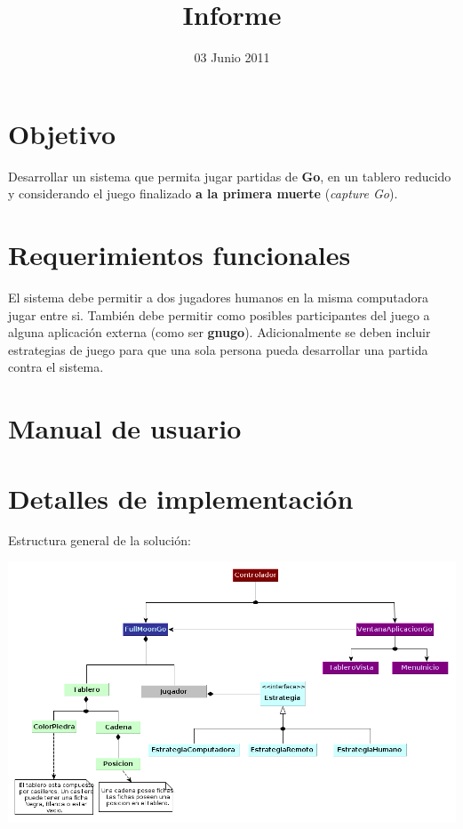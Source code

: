 \documentclass[11pt]{article}
\title{Informe}
\author{}
\date{03 Junio 2011}
\begin{document}
\thispagestyle{empty}
  

\setcounter{tocdepth}{3}
\tableofcontents
\vspace*{1cm}
\section{Objetivo}
\label{sec-1}

  Desarrollar un sistema que permita jugar partidas de \textbf{Go}, en un
  tablero reducido y considerando el juego finalizado \textbf{a la primera   muerte} (\emph{capture Go}).

\section{Requerimientos funcionales}
\label{sec-2}

  El sistema debe permitir a dos jugadores humanos en la misma
  computadora jugar entre si. También debe permitir como posibles
  participantes del juego a alguna aplicación externa (como ser
  \textbf{gnugo}). Adicionalmente se deben incluir estrategias de juego para
  que una sola persona pueda desarrollar una partida contra el
  sistema.

\section{Manual de usuario}
\label{sec-3}


\section{Detalles de implementación}
\label{sec-4}

Estructura general de la soluci\'on:

\begin{center}
 \includegraphics[scale=0.55]{./Diagramas/DiagramaClases/diagrama_de_clases.png}
\end{center}
\end{document}

